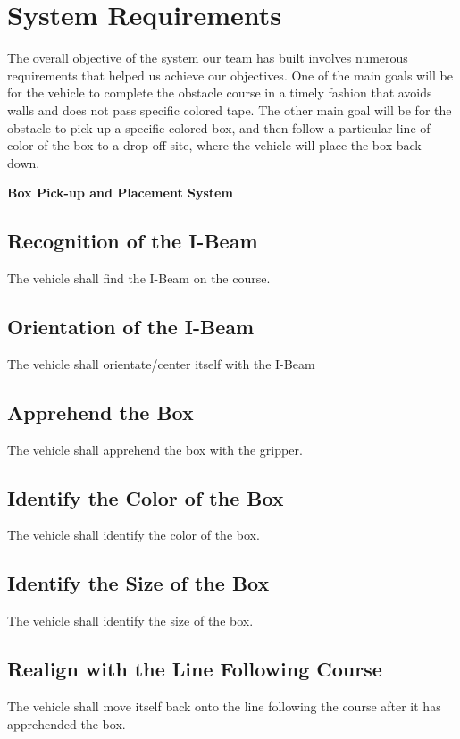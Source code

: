 \documentclass{article}
\begin{document}
\section{System Requirements}
The overall objective of the system our team has built involves numerous requirements that helped us achieve our objectives. One of the main goals will be for the vehicle to complete the obstacle course in a timely fashion that avoids walls and does not pass specific colored tape. The other main goal will be for the obstacle to pick up a specific colored box, and then follow a particular line of color of the box to a drop-off site, where the vehicle will place the box back down.\vspace{1em}\newline

\noindent\textbf{\Large Box Pick-up and Placement System}

\subsection{Recognition of the I-Beam}
The vehicle shall find the I-Beam on the course.

\subsection{Orientation of the I-Beam}
The vehicle shall orientate/center itself with the I-Beam

\subsection{Apprehend the Box}
The vehicle shall apprehend the box with the gripper.

\subsection{Identify the Color of the Box}
The vehicle shall identify the color of the box.

\subsection{Identify the Size of the Box}
The vehicle shall identify the size of the box. 

\subsection{Realign with the Line Following Course}
The vehicle shall move itself back onto the line following the course after it has apprehended the box.
\end{document}
